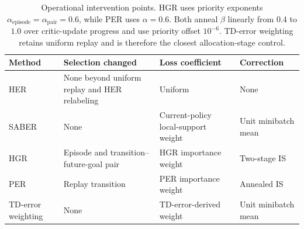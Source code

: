 \begin{table}[t]
\centering
\small
\setlength{\tabcolsep}{5pt}
\begin{tabular}{llll}
\toprule
Method & Selection changed & Loss coefficient & Correction \\
\midrule
HER & None beyond uniform replay and HER relabeling & Uniform & None \\
SABER & None & Current-policy local-support weight & Unit minibatch mean \\
HGR & Episode and transition--future-goal pair & HGR importance weight & Two-stage IS \\
PER & Replay transition & PER importance weight & Annealed IS \\
TD-error weighting & None & TD-error-derived weight & Unit minibatch mean \\
\bottomrule
\end{tabular}
\caption{Operational intervention points. HGR uses priority exponents
\(\alpha_{\mathrm{episode}}=\alpha_{\mathrm{pair}}=0.6\), while PER uses
\(\alpha=0.6\). Both anneal \(\beta\) linearly from \(0.4\) to \(1.0\) over
critic-update progress and use priority offset \(10^{-6}\). TD-error weighting
retains uniform replay and is therefore the closest allocation-stage control.}
\label{tab:supp-comparison-settings}
\end{table}
